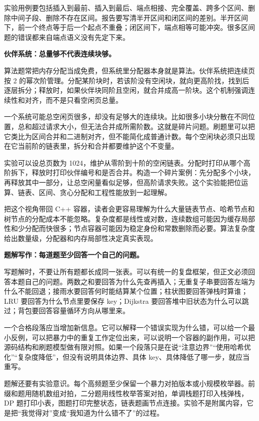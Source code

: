 实验用例要包括插入到最前、插入到最后、端点相接、完全覆盖、跨多个区间、删除中间子段、删除不存在区间。报告要写清半开区间和闭区间的差别。半开区间下，前一个终点等于后一个起点不重叠；闭区间下，端点相等可能冲突。很多区间题的错误都来自端点语义没有先定下来。

\noindent\textbf{伙伴系统：总量够不代表连续块够。}

算法题常把内存分配当成免费，但系统里分配器本身就是算法。伙伴系统把连续页按 2 的幂次阶管理。分配某阶块时，若该阶没有空闲块，就向更高阶找，找到后逐层拆分；释放时，如果伙伴块同阶且空闲，就合并成高一阶块。这个机制强调连续性和对齐，而不是只看空闲页总量。

一个系统可能总空闲页很多，却没有足够大的连续块。比如很多小块分散在不同位置，总和超过请求大小，但无法合并成所需阶数。这就是碎片问题。刷题里可以把它类比为区间合并和二进制对齐，但不能简化成普通计数。每个空闲块必须只出现在它当前阶的链表里，拆分和合并都要维护这个不变量。

实验可以设总页数为 1024，维护从零阶到十阶的空闲链表。分配时打印从哪个高阶拆下，释放时打印伙伴编号和是否合并。构造一个碎片案例：先分配多个小块，再释放其中一部分，让总空闲量看似足够，但高阶请求失败。这个实验能把位运算、链表、区间、贪心分配和工程性能放到一起理解。

把这个视角带回 C++ 容器，读者会更容易理解为什么大量链表节点、哈希节点和树节点的分配成本不能忽略。复杂度都是线性或对数，连续数组可能因为缓存局部性和少分配而快很多；节点容器可能因为稳定身份和常数删除而必要。算法复杂度给出数量级，分配器和内存局部性决定真实表现。

\noindent\textbf{题解写作：每道题至少回答一个自己的问题。}

写题解时，不要让所有题都长成同一张表。可以有统一的复盘框架，但正文必须回答本题自己的问题。两数之和要回答为什么先查再插入；无重复子串要回答左端为什么不能回退；接雨水要回答何时能结算某个位置；柱状图要回答弹栈时算谁；LRU 要回答为什么节点里要保存 key；Dijkstra 要回答堆中旧状态为什么可以跳过；背包要回答容量循环方向从哪里来。

一个合格段落应当增加新信息。它可以解释一个错误实现为什么错，可以给一个最小反例，可以把暴力中的重复工作定位出来，可以说明一个容器的副作用，可以把源码结构和刷题模型做有限对照。如果一个段落只是在说“注意边界”“使用哈希优化”“复杂度降低”，但没有说明具体边界、具体 key、具体降低了哪一步，就应当重写。

题解还要有实验意识。每个高频题至少保留一个暴力对拍版本或小规模枚举器。前缀和题用随机数组对拍，二分题用线性枚举答案对拍，单调栈题打印入栈弹栈，DP 题打印小表，图题打印完整状态，链表题画节点连接。实验不是附属内容，它是把“我觉得对”变成“我知道为什么错不了”的过程。

